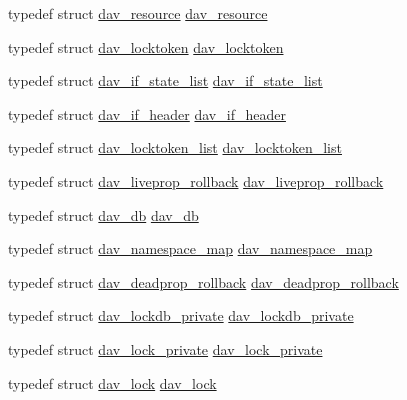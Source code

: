\begin{DoxyCompactItemize}
\item 
typedef struct \hyperlink{structdav__resource}{dav\+\_\+resource} \hyperlink{group__MOD__DAV_ga3c6a9bf4a34a360a07f269dc4aa783e2}{dav\+\_\+resource}
\item 
typedef struct \hyperlink{structdav__locktoken}{dav\+\_\+locktoken} \hyperlink{group__MOD__DAV_ga97f63d90aa669c1fa6551842d3c803e3}{dav\+\_\+locktoken}
\item 
typedef struct \hyperlink{structdav__if__state__list}{dav\+\_\+if\+\_\+state\+\_\+list} \hyperlink{group__MOD__DAV_gaf195143ed1d91d770e93caed11ce5ce5}{dav\+\_\+if\+\_\+state\+\_\+list}
\item 
typedef struct \hyperlink{structdav__if__header}{dav\+\_\+if\+\_\+header} \hyperlink{group__MOD__DAV_ga1a21f29b09e55f34321b710885506fd4}{dav\+\_\+if\+\_\+header}
\item 
typedef struct \hyperlink{structdav__locktoken__list}{dav\+\_\+locktoken\+\_\+list} \hyperlink{group__MOD__DAV_ga88eab7a69068f5595f82210267250d7e}{dav\+\_\+locktoken\+\_\+list}
\item 
typedef struct \hyperlink{group__MOD__DAV_gafa19778d61300befd3b972a18cd564d5}{dav\+\_\+liveprop\+\_\+rollback} \hyperlink{group__MOD__DAV_gafa19778d61300befd3b972a18cd564d5}{dav\+\_\+liveprop\+\_\+rollback}
\item 
typedef struct \hyperlink{structdav__db}{dav\+\_\+db} \hyperlink{group__MOD__DAV_ga7600f4d1916918bf969eb543c5399568}{dav\+\_\+db}
\item 
typedef struct \hyperlink{structdav__namespace__map}{dav\+\_\+namespace\+\_\+map} \hyperlink{group__MOD__DAV_gacd79bb3e59ca44135b1037d2e0aa5f29}{dav\+\_\+namespace\+\_\+map}
\item 
typedef struct \hyperlink{structdav__deadprop__rollback}{dav\+\_\+deadprop\+\_\+rollback} \hyperlink{group__MOD__DAV_ga6fd5e66543b954f28aef968ede259862}{dav\+\_\+deadprop\+\_\+rollback}
\item 
typedef struct \hyperlink{structdav__lockdb__private}{dav\+\_\+lockdb\+\_\+private} \hyperlink{group__MOD__DAV_ga1a051de73610d45ef4200319270c5dae}{dav\+\_\+lockdb\+\_\+private}
\item 
typedef struct \hyperlink{structdav__lock__private}{dav\+\_\+lock\+\_\+private} \hyperlink{group__MOD__DAV_gaea2b96e0ff557afc868d5fa3894f6b9d}{dav\+\_\+lock\+\_\+private}
\item 
typedef struct \hyperlink{structdav__lock}{dav\+\_\+lock} \hyperlink{group__MOD__DAV_ga1cff82155446038cb3433376c78eb085}{dav\+\_\+lock}
\item 

\end{DoxyCompactItemize}
